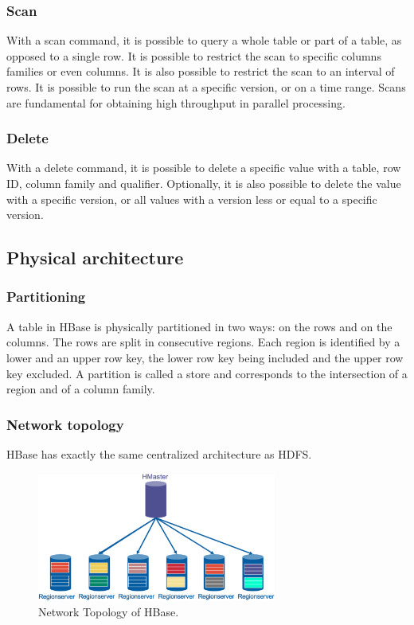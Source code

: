\subsubsection{Scan}
With a scan command, it is possible to query a whole table or part of a table, as opposed to a single row. It is possible to restrict the scan to specific columns families or even columns. It is also possible to restrict the scan to an interval of rows. It is possible to run the scan at a specific version, or on a time range. Scans are fundamental for obtaining high throughput in parallel processing.

\subsubsection{Delete}
With a delete command, it is possible to delete a specific value with a table, row ID, column family and qualifier. Optionally, it is also possible to delete the value with a specific version, or all values with a version less or equal to a specific version.

\subsection{Physical architecture}

\subsubsection{Partitioning}
A table in HBase is physically partitioned in two ways: on the rows and on the columns. The rows are split in consecutive regions. Each region is identified by a lower and an upper row key, the lower row key being included and the upper row key excluded.
A partition is called a store and corresponds to the intersection of a region and of a column family.


\subsubsection{Network topology}
HBase has exactly the same centralized architecture as HDFS.

\begin{figure}[h]
    \centering
    \includegraphics[width=0.7\textwidth]{Figures/HBaseNetworkTopology.jpeg}
    \caption{Network Topology of HBase.}\label{fig:HBNetTop}
\end{figure}

